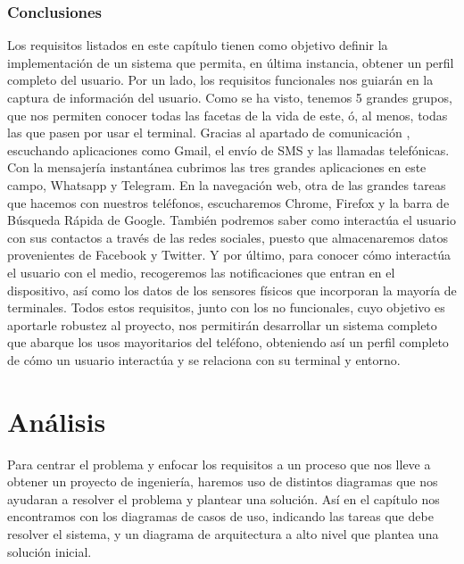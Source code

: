\documentclass[12pt,a4paper,oneside]{book} %
\begin{document}
\subsection{Conclusiones}
Los requisitos listados en este capítulo tienen como objetivo definir la implementación de un sistema que permita, en última instancia, obtener un perfil completo del usuario. 
\newline \newline 
Por un lado, los requisitos funcionales nos guiarán en la captura de información del usuario. Como se ha visto, tenemos 5 grandes grupos, que nos permiten conocer todas las facetas de la vida de este, ó, al menos, todas las que pasen por usar el terminal. 
\newline \newline
Gracias al apartado de comunicación , escuchando aplicaciones como Gmail, el envío de SMS y las llamadas telefónicas. Con la mensajería instantánea cubrimos las tres grandes aplicaciones en este campo, Whatsapp y Telegram. En la navegación web, otra de las grandes tareas que hacemos con nuestros teléfonos, escucharemos Chrome, Firefox y la barra de Búsqueda Rápida de Google. 
\newline \newline 
También podremos saber como interactúa el usuario con sus contactos a través de las redes sociales, puesto que almacenaremos datos provenientes de Facebook y Twitter. Y por último, para conocer cómo interactúa el usuario con el medio, recogeremos las notificaciones que entran en el dispositivo, así como los datos de los sensores físicos que incorporan la mayoría de terminales. 
\newline \newline 
Todos estos requisitos, junto con los no funcionales, cuyo objetivo es aportarle robustez al proyecto, nos permitirán desarrollar un sistema completo que abarque los usos mayoritarios del teléfono, obteniendo así un perfil completo de cómo un usuario interactúa y se relaciona con su terminal y entorno. 
\break
\chapter{Análisis}
Para centrar el problema y enfocar los requisitos a un proceso que nos lleve a obtener un proyecto de ingeniería, haremos uso de distintos diagramas que nos ayudaran a resolver el problema y plantear una solución. Así en el capítulo nos encontramos con los diagramas de casos de uso, indicando las tareas que debe resolver el sistema, y un diagrama de arquitectura a alto nivel que plantea una solución inicial. 
\end{document}
